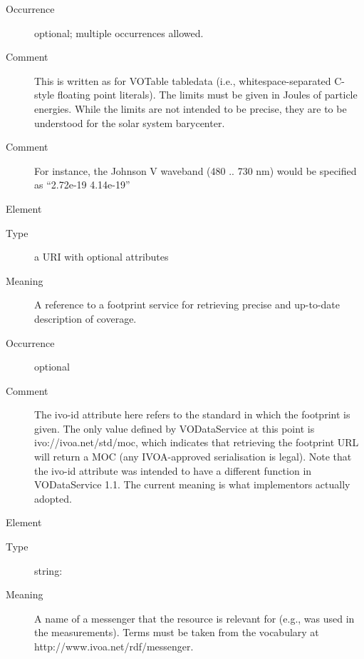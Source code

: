 \documentclass[11pt,a4paper]{ivoa}
\begin{document}
\begin{generated}
\begin{bigdescription}
\begin{description}
\item[Occurrence] optional; multiple occurrences allowed.

\item[Comment] 
                  This is written as for VOTable tabledata (i.e., 
                  whitespace-separated C-style floating point literals).
                  The limits must be given in Joules of particle
                  energies.  While the limits are not intended 
                  to be precise, they are to be understood for the
                  solar system barycenter.
               
\item[Comment] 
                  For instance, the Johnson V waveband (480 .. 730 nm)
                  would be specified as “2.72e-19 4.14e-19”
               

\end{description}
\item[Element \xmlel{footprint}]
\begin{description}
\item[Type] a URI with optional attributes
\item[Meaning] 
                  A reference to a footprint service for retrieving 
                  precise and up-to-date description of coverage.  
               
\item[Occurrence] optional
\item[Comment] 
                  The ivo-id attribute here refers to the standard in which
                  the footprint is given.  The only value defined by 
                  VODataService at this point is ivo://ivoa.net/std/moc, 
                  which indicates that retrieving the footprint URL will return
                  a MOC (any IVOA-approved serialisation is legal).  Note that
                  the ivo-id attribute was intended to have a different
                  function in VODataService 1.1.  The current meaning is what
                  implementors actually adopted.
               

\end{description}
\item[Element \xmlel{waveband}]
\begin{description}
\item[Type] string: 
\item[Meaning] 
                  A name of a messenger that the resource is relevant for
                  (e.g., was used in the measurements).  Terms must
                  be taken from the vocabulary at 
                  http://www.ivoa.net/rdf/messenger.
               

\end{description}
\end{bigdescription}
\end{generated}
\end{document}
